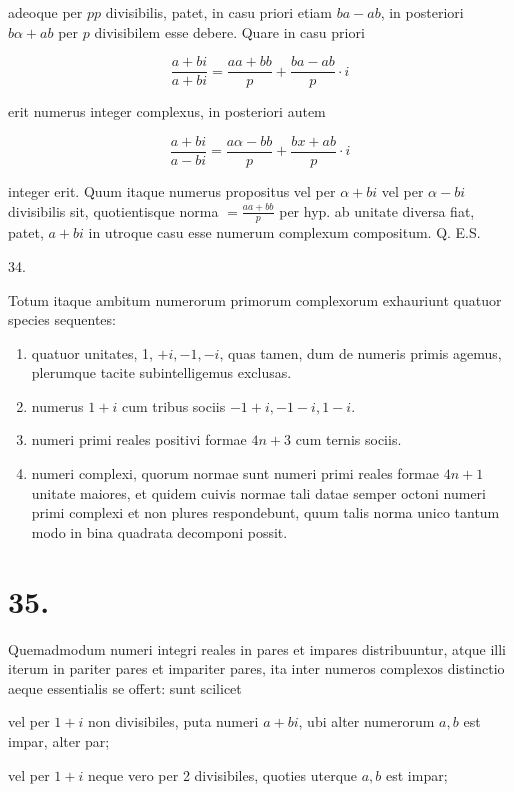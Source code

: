 \documentclass[10pt]{article}
\begin{document}
adeoque per \(p p\) divisibilis, patet, in casu priori etiam \(b a-a b\), in posteriori \(b \alpha+a b\) per \(p\) divisibilem esse debere. Quare in casu priori

\[
\frac{a+b i}{a+b i}=\frac{a a+b b}{p}+\frac{b a-a b}{p} \cdot i
\]

erit numerus integer complexus, in posteriori autem

\[
\frac{a+b i}{a-b i}=\frac{a \alpha-b b}{p}+\frac{b x+a b}{p} \cdot i
\]

integer erit. Quum itaque numerus propositus vel per \(\alpha+b i\) vel per \(\alpha-b i\) divisibilis sit, quotientisque norma \(=\frac{a a+b b}{p}\) per hyp. ab unitate diversa fiat, patet, \(a+b i\) in utroque casu esse numerum complexum compositum. Q. E.S.

34.

Totum itaque ambitum numerorum primorum complexorum exhauriunt quatuor species sequentes:

\begin{enumerate}
  \item quatuor unitates, 1, \(+i,-1,-i\), quas tamen, dum de numeris primis agemus, plerumque tacite subintelligemus exclusas.

  \item numerus \(1+i\) cum tribus sociis \(-1+i,-1-i, 1-i\).

  \item numeri primi reales positivi formae \(4 n+3\) cum ternis sociis.

  \item numeri complexi, quorum normae sunt numeri primi reales formae \(4 n+1\) unitate maiores, et quidem cuivis normae tali datae semper octoni numeri primi complexi et non plures respondebunt, quum talis norma unico tantum modo in bina quadrata decomponi possit.

\end{enumerate}

\section*{35.}
Quemadmodum numeri integri reales in pares et impares distribuuntur, atque illi iterum in pariter pares et impariter pares, ita inter numeros complexos distinctio aeque essentialis se offert: sunt scilicet

vel per \(1+i\) non divisibiles, puta numeri \(a+b i\), ubi alter numerorum \(a, b\) est impar, alter par;

vel per \(1+i\) neque vero per 2 divisibiles, quoties uterque \(a, b\) est impar;
\end{document}
